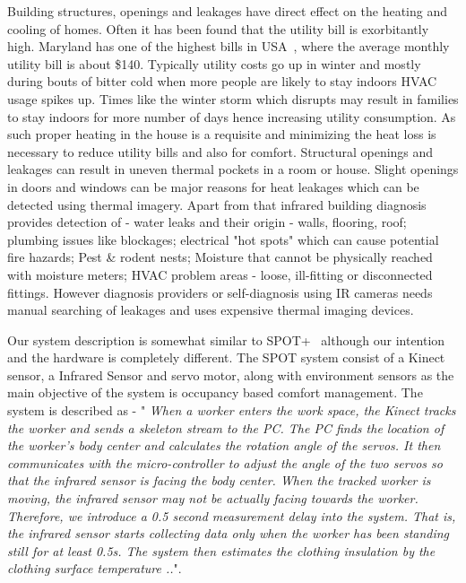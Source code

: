 \documentclass{sig-alternate}
\begin{document}
 \indent Building structures, openings and leakages have direct effect on the heating and cooling of homes. Often it has been found that the utility bill is exorbitantly high. Maryland has one of the highest bills in USA~\cite{EIA2014}, where the average monthly utility bill is about \$140. Typically utility costs go up in winter and mostly during bouts of bitter cold when more people are likely to stay indoors HVAC usage spikes up. Times like the winter storm which disrupts may result in families to stay indoors for more number of days hence increasing utility consumption. As such proper heating in the house is a requisite and minimizing the heat loss is necessary to reduce utility bills and also for comfort. Structural openings and leakages can result in uneven thermal pockets in a room or house. Slight openings in doors and windows can be major reasons for heat leakages which can be detected using thermal imagery. Apart from that infrared building diagnosis provides detection of - water leaks and their origin - walls, flooring, roof; plumbing issues like blockages; electrical "hot spots" which can cause potential fire hazards; Pest \& rodent nests; Moisture that cannot be physically reached with moisture meters; HVAC problem areas - loose, ill-fitting or disconnected fittings. However diagnosis providers or self-diagnosis using IR cameras needs manual searching of leakages and uses expensive thermal imaging devices. 
  
 \indent Our system description is somewhat similar to SPOT+~\cite{SPOT,SPOT+} although our intention and the hardware is completely different. The SPOT system consist of a Kinect sensor, a Infrared Sensor and servo motor, along with environment sensors as the main objective of the system is occupancy based comfort management. The system is described as - "\textit{ When a worker enters the work space, the Kinect tracks the worker and sends a skeleton stream to the PC. The PC finds the location of the worker's body center and calculates the rotation angle of the servos. It then communicates with the micro-controller to adjust the angle of the two servos so that the infrared sensor is facing the body center. When the tracked worker is moving, the infrared sensor may not be actually facing towards the worker. Therefore, we introduce a 0.5 second measurement delay into the system. That is, the infrared sensor starts collecting data only when the worker has been standing still for at least 0.5s. The system then estimates the clothing insulation by the clothing surface temperature ..}". 
\end{document}
